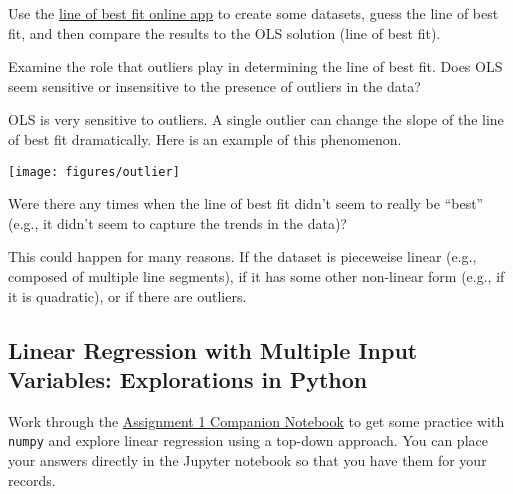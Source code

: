 \documentclass[assignment01_Solutions]{subfiles}
\begin{document}
\begin{externalresources} [(10 minutes)]
Use the \href{http://www.shodor.org/interactivate/activities/Regression/}{line of best fit online app} to create some datasets, guess the line of best fit, and then compare the results to the OLS solution (line of best fit).

\begin{exercise}
\bes
\item Examine the role that outliers play in determining the line of best fit.  Does OLS seem sensitive or insensitive to the presence of outliers in the data?
\begin{boxedsolution}
OLS is very sensitive to outliers.  A single outlier can change the slope of the line of best fit dramatically.  Here is an example of this phenomenon.

\begin{center}
\texttt{[image: figures/outlier]}
\end{center}

\end{boxedsolution}

\item Were there any times when the line of best fit didn't seem to really be ``best'' (e.g., it didn't seem to capture the trends in the data)?
\begin{boxedsolution}
This could happen for many reasons.  If the dataset is pieceweise linear (e.g., composed of multiple line segments), if it has some other non-linear form (e.g., if it is quadratic), or if there are outliers.
\end{boxedsolution}

\ees
\end{exercise}

\end{externalresources}



\subsection{Linear Regression with Multiple Input Variables: Explorations in Python}
\begin{externalresources}[(60 minutes)]
Work through the \href{https://colab.research.google.com/drive/1QPsD2URWupxWjpBfKsr7AcIZ2m3VD37T?usp=sharing}{Assignment 1 Companion Notebook} to get some practice with {\tt numpy} and explore linear regression using a top-down approach.  You can place your answers directly in the Jupyter notebook so that you have them for your records.
\end{externalresources}

\end{document}
